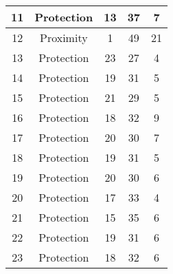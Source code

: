 \documentclass[results.tex]{subfiles}
\begin{document}
\begin{center}
\begin{tabular}{| c || c | c | c | c |}
            \hline
            11                      & Protection                   & 13                     & 37                      & 7                    \\
            \hline
            12                      & Proximity                    & 1                      & 49                      & 21                   \\
            \hline
            13                      & Protection                   & 23                     & 27                      & 4                    \\
            \hline
            14                      & Protection                   & 19                     & 31                      & 5                    \\
            \hline
            15                      & Protection                   & 21                     & 29                      & 5                    \\
            \hline
            16                      & Protection                   & 18                     & 32                      & 9                    \\
            \hline
            17                      & Protection                   & 20                     & 30                      & 7                    \\
            \hline
            18                      & Protection                   & 19                     & 31                      & 5                    \\
            \hline
            19                      & Protection                   & 20                     & 30                      & 6                    \\
            \hline
            20                      & Protection                   & 17                     & 33                      & 4                    \\
            \hline
            21                      & Protection                   & 15                     & 35                      & 6                    \\
            \hline
            22                      & Protection                   & 19                     & 31                      & 6                    \\
            \hline
            23                      & Protection                   & 18                     & 32                      & 6                    \\

\end{tabular}
\end{center}
\end{document}
